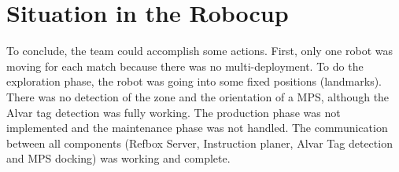 \section{Situation in the Robocup}

To conclude, the team could accomplish some actions. First, only one robot was moving for each match because there was no multi-deployment. To do the exploration phase, the robot was going into some fixed positions (landmarks). There was no detection of the zone and the orientation of a MPS, although the Alvar tag detection was fully working. The production phase was not implemented and the maintenance phase was not handled. The communication between all components (Refbox Server, Instruction planer, Alvar Tag detection and MPS docking) was working and complete. 